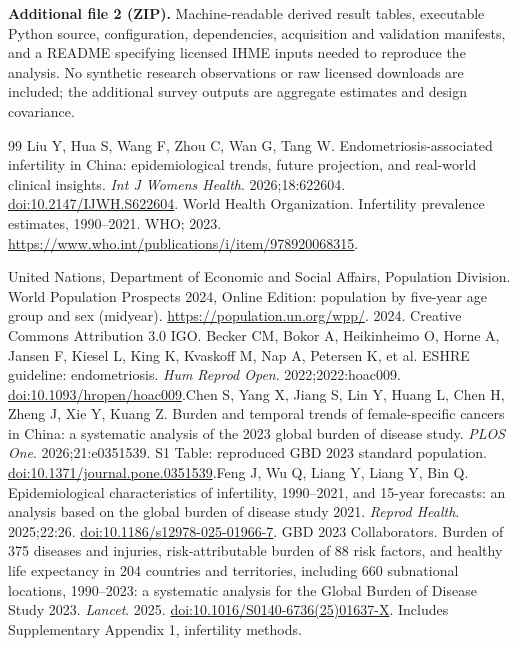 \documentclass[11pt,a4paper]{article}
\begin{document}
\textbf{Additional file 2 (ZIP).} Machine-readable derived result tables, executable Python source, configuration, dependencies, acquisition and validation manifests, and a README specifying licensed IHME inputs needed to reproduce the analysis. No synthetic research observations or raw licensed downloads are included; the additional survey outputs are aggregate estimates and design covariance.
{\small\doublespacing
\begin{thebibliography}{99}
 Liu Y, Hua S, Wang F, Zhou C, Wan G, Tang W. Endometriosis-associated infertility in China: epidemiological trends, future projection, and real-world clinical insights. \emph{Int J Womens Health}. 2026;18:622604. \href{https://doi.org/10.2147/IJWH.S622604}{doi:10.2147/IJWH.S622604}.
 World Health Organization. Infertility prevalence estimates, 1990--2021. WHO; 2023. \url{https://www.who.int/publications/i/item/978920068315}.

 United Nations, Department of Economic and Social Affairs, Population Division. World Population Prospects 2024, Online Edition: population by five-year age group and sex (midyear). \url{https://population.un.org/wpp/}. 2024. Creative Commons Attribution 3.0 IGO.
Becker CM, Bokor A, Heikinheimo O, Horne A, Jansen F, Kiesel L, King K, Kvaskoff M, Nap A, Petersen K, et al. ESHRE guideline: endometriosis. \emph{Hum Reprod Open}. 2022;2022:hoac009. \href{https://doi.org/10.1093/hropen/hoac009}{doi:10.1093/hropen/hoac009}.Chen S, Yang X, Jiang S, Lin Y, Huang L, Chen H, Zheng J, Xie Y, Kuang Z. Burden and temporal trends of female-specific cancers in China: a systematic analysis of the 2023 global burden of disease study. \emph{PLOS One}. 2026;21:e0351539. S1 Table: reproduced GBD 2023 standard population. \href{https://doi.org/10.1371/journal.pone.0351539}{doi:10.1371/journal.pone.0351539}.Feng J, Wu Q, Liang Y, Liang Y, Bin Q. Epidemiological characteristics of infertility, 1990--2021, and 15-year forecasts: an analysis based on the global burden of disease study 2021. \emph{Reprod Health}. 2025;22:26. \href{https://doi.org/10.1186/s12978-025-01966-7}{doi:10.1186/s12978-025-01966-7}. GBD 2023 Collaborators. Burden of 375 diseases and injuries, risk-attributable burden of 88 risk factors, and healthy life expectancy in 204 countries and territories, including 660 subnational locations, 1990--2023: a systematic analysis for the Global Burden of Disease Study 2023. \emph{Lancet}. 2025. \href{https://doi.org/10.1016/S0140-6736(25)01637-X}{doi:10.1016/S0140-6736(25)01637-X}. Includes Supplementary Appendix 1, infertility methods.


\end{thebibliography}}
\end{document}
